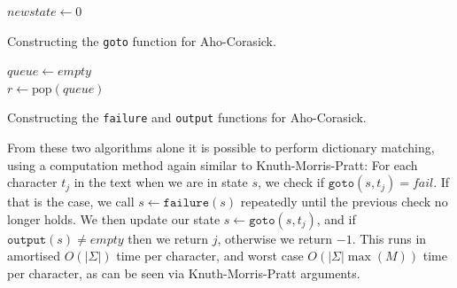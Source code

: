 \documentclass[ %
                    author={Dominic Joseph Moylett},
                    degree={MEng},
                     title={Dictionary Matching with Fingerprints},
                  subtitle={An Empirical Analysis},
                      type={research},
                      year={2015} ]{dissertation}
\begin{document}
\begin{algorithm}[t]
$newstate \gets 0$\\
\caption{Constructing the \texttt{goto} function for Aho-Corasick.}
\label{alg:ac-goto}
\end{algorithm}

\begin{algorithm}[t]
$queue \gets empty$\\
 {
  $r \gets \text{pop}(queue)$\\
}
\caption{Constructing the \texttt{failure} and \texttt{output} functions for Aho-Corasick.}
\label{alg:ac-failure}
\end{algorithm}

From these two algorithms alone it is possible to perform dictionary matching, using a computation method again similar to Knuth-Morris-Pratt: For each character $t_j$ in the text when we are in state $s$, we check if $\texttt{goto}(s, t_j) = fail$. If that is the case, we call $s \gets \texttt{failure}(s)$ repeatedly until the previous check no longer holds. We then update our state $s \gets \texttt{goto}(s, t_j)$, and if $\texttt{output}(s) \neq empty$ then we return $j$, otherwise we return $-1$. This runs in amortised $O(|\Sigma|)$ time per character, and worst case $O(|\Sigma|\max(M))$ time per character, as can be seen via Knuth-Morris-Pratt arguments.
\end{document}

